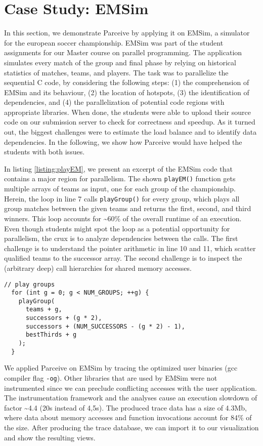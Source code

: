 \section{Case Study: EMSim}
\label{sec:case_study}
In this section, we demonstrate Parceive by applying it on EMSim, a simulator
for the european soccer championship. EMSim was part of the student assignments
for our Master course on parallel programming. The application simulates every
match of the group and final phase by relying on historical statistics of
matches, teams, and players. The task was to parallelize the sequential
C code, by considering the following steps: (1) the comprehension of EMSim and
its behaviour, (2) the location of hotspots, (3) the identification of
dependencies, and (4) the parallelization of potential code regions with
appropriate libraries. When done, the students were able to upload their source
code on our submission server to check for correctness and speedup. As it
turned out, the biggest challenges were to estimate the load balance and to
identify data dependencies. In the following, we show how Parceive would have
helped the students with both issues.

In listing \ref{listing:playEM}, we present an excerpt of the EMSim code that
contains a major region for parallelism. The shown \texttt{playEM()} function
gets multiple arrays of teams as input, one for each group of the championship.
Herein, the loop in line 7 calls \texttt{playGroup()} for every group, which
plays all group matches between the given teams and returns the first, second,
and third winners. This loop accounts for \textasciitilde60\% of the overall
runtime of an execution. Even though students might spot the loop as a
potential opportunity for parallelism, the crux is to analyze dependencies
between the calls. The first challenge is to understand the pointer arithmetic
in line 10 and 11, which scatter qualified teams to the successor array. The
second challenge is to inspect the (arbitrary deep) call hierarchies for shared
memory accesses.

\begin{lstlisting}[caption=A major region for loop-parallelism in the
EMSim code, label=listing:playEM]
  // play groups
  for (int g = 0; g < NUM_GROUPS; ++g) {
    playGroup(
      teams + g,
      successors + (g * 2),
      successors + (NUM_SUCCESSORS - (g * 2) - 1),
      bestThirds + g
    );
  }
\end{lstlisting}

We applied Parceive on EMSim by tracing the optimized user binaries (gcc
compiler flag \texttt{-og}). Other libraries that are used by EMSim were not
instrumented since we can preclude conflicting accesses with the user
application. The instrumentation framework and the analyses cause an execution
slowdown of factor \textasciitilde 4.4 (20s instead of 4,5s). The produced
trace data has a size of 4.3Mb, where data about memory accesses and function
invocations account for 84\% of the size. After producing the trace database,
we can import it to our visualization and show the resulting views.

